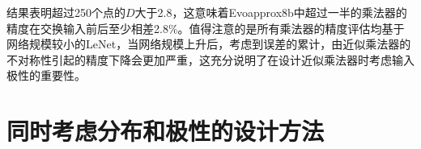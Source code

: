 结果表明超过250个点的$D$大于2.8，这意味着Evoapprox8b\cite{AC:AM:CGP_Evoapprox8b}中超过一半的乘法器的精度在交换输入前后至少相差2.8\%。值得注意的是所有乘法器的精度评估均基于网络规模较小的LeNet，当网络规模上升后，考虑到误差的累计，由近似乘法器的不对称性引起的精度下降会更加严重，这充分说明了在设计近似乘法器时考虑输入极性的重要性。



\section{同时考虑分布和极性的设计方法}

